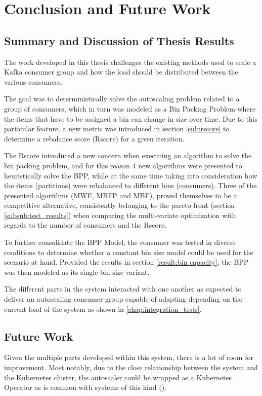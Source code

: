 \chapter{Conclusion and Future Work} 
\label{chap:conclusions}

\section{Summary and Discussion of Thesis Results}

The work developed in this thesis challenges the existing methods used to scale
a Kafka consumer group and how the load should be distributed between the
various consumers.

The goal was to deterministically solve the autoscaling problem related to a
group of consumers, which in turn was modeled as a Bin Packing Problem where the
items that have to be assigned a bin can change in size over time. Due to this
particular feature, a new metric was introduced in section \ref{sub:rscore} to
determine a rebalance score (Rscore) for a given iteration. 

The Rscore introduced a new concern when executing an algorithm to solve the bin
packing problem, and for this reason 4 new algorithms were presented to
heuristically solve the BPP, while at the same time taking into consideration
how the items (partitions) were rebalanced to different bins (consumers). Three
of the presented algorithms (MWF, MBFP and MBF), proved themselves to be a
competitive alternative, consistently belonging to the pareto front
(section \ref{subsub:test_results}) when comparing the multi-variate optimization with
regards to the number of consumers and the Rscore.

To further consolidate the BPP Model, the consumer was tested in diverse
conditions to determine whether a constant bin size model could be used for the
scenario at hand. Provided the results in section \ref{result:bin capacity}, the BPP was
then modeled as its single bin size variant.

The different parts in the system interacted with one another as expected to
deliver an autoscaling consumer group capable of adapting depending on the
current load of the system as shown in \ref{chap:integration_tests}.

\section{Future Work}

Given the multiple parts developed within this system, there is a lot of room
for improvement. Most notably, due to the close relationship between the system
and the Kubernetes cluster, the autoscaler could be wrapped as a Kubernetes
Operator \cite{KuberenetesOperator} as is common with systems of this kind
(\cite{Kubegres, PulumiOperator, KEDA}).

